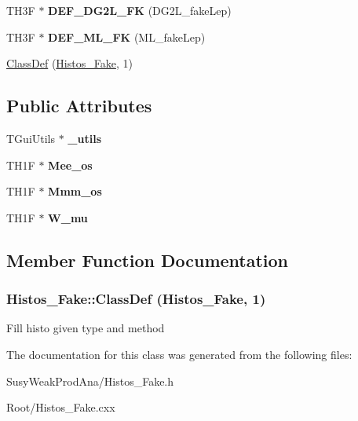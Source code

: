 \begin{DoxyCompactItemize}
\item 
\hypertarget{classHistos__Fake_aff64d09babc83aed6181d475d591364d}{
TH3F $\ast$ {\bfseries DEF\_\-DG2L\_\-FK} (DG2L\_\-fakeLep)}
\label{classHistos__Fake_aff64d09babc83aed6181d475d591364d}

\item 
\hypertarget{classHistos__Fake_a5c94ab02217b1e95b6303eac51191121}{
TH3F $\ast$ {\bfseries DEF\_\-ML\_\-FK} (ML\_\-fakeLep)}
\label{classHistos__Fake_a5c94ab02217b1e95b6303eac51191121}

\item 
\hyperlink{classHistos__Fake_a838ecba285e34d69a9c4800b9f6d945b}{ClassDef} (\hyperlink{classHistos__Fake}{Histos\_\-Fake}, 1)
\end{DoxyCompactItemize}
\subsection*{Public Attributes}
\begin{DoxyCompactItemize}
\item 
\hypertarget{classHistos__Fake_a1f2c5c2a5671daeb6e2f9ef2d7c135c5}{
TGuiUtils $\ast$ {\bfseries \_\-utils}}
\label{classHistos__Fake_a1f2c5c2a5671daeb6e2f9ef2d7c135c5}

\item 
\hypertarget{classHistos__Fake_a0cbc0cbee61d10e84138026f45687da5}{
TH1F $\ast$ {\bfseries Mee\_\-os}}
\label{classHistos__Fake_a0cbc0cbee61d10e84138026f45687da5}

\item 
\hypertarget{classHistos__Fake_aabdbfc3e59980787df128cf9ecb1539c}{
TH1F $\ast$ {\bfseries Mmm\_\-os}}
\label{classHistos__Fake_aabdbfc3e59980787df128cf9ecb1539c}

\item 
\hypertarget{classHistos__Fake_a818e96e9db9cb931e30a106d2abbad58}{
TH1F $\ast$ {\bfseries W\_\-mu}}
\label{classHistos__Fake_a818e96e9db9cb931e30a106d2abbad58}

\end{DoxyCompactItemize}


\subsection{Member Function Documentation}
\hypertarget{classHistos__Fake_a838ecba285e34d69a9c4800b9f6d945b}{
\subsubsection[{ClassDef}]{\setlength{\rightskip}{0pt plus 5cm}Histos\_\-Fake::ClassDef ({\bf Histos\_\-Fake}, \/  1)}}
\label{classHistos__Fake_a838ecba285e34d69a9c4800b9f6d945b}
Fill histo given type and method 

The documentation for this class was generated from the following files:\begin{DoxyCompactItemize}
\item 
SusyWeakProdAna/Histos\_\-Fake.h\item 
Root/Histos\_\-Fake.cxx\end{DoxyCompactItemize}
